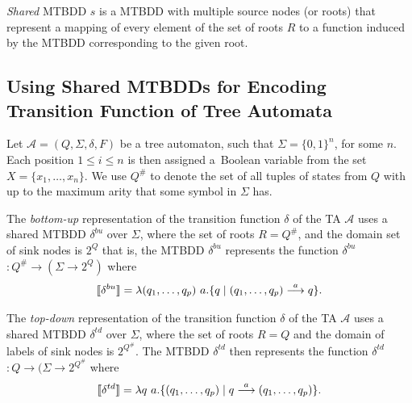 \emph{Shared} MTBDD $s$ is a MTBDD with multiple source nodes (or roots) that
represent a mapping of every element of the set of roots $R$ to a function
induced by the MTBDD corresponding to the given root.

\subsection[Usage of MTBDDs with TA]{Using Shared MTBDDs for Encoding
Transition Function of Tree Automata} Let $\mathcal{A} = (Q, \Sigma, \delta, F)$
be a tree automaton, such that $\Sigma = \{0, 1\}^n$, for some $n$. Each
position $1 \leq i \leq n$ is then assigned a~Boolean variable from the set $X =
\{x_1,\ldots,x_n\}$. We use $Q^\#$ to denote the set of all tuples of states from $Q$ with up to the
maximum arity that some symbol in $\Sigma$ has.

The \emph{bottom-up} representation of the transition function $\delta$ of the
TA $\mathcal{A}$ uses a shared MTBDD $\delta^{bu}$ over $\Sigma$, where the set
of roots $R = Q^\#$, and the domain set of sink nodes is $2^Q$ that is, the
MTBDD $\delta^{bu}$ represents the function \textlbrackdbl $\delta^{bu}$
\textrbrackdbl $: Q^\# \rightarrow (\Sigma \rightarrow 2^Q)$ where
 \begin{equation}
  \text{\textlbrackdbl} \delta^{bu} \text{\textrbrackdbl} =
 \lambda (q_1,\ldots,q_p)\ a . \{q \mid (q_1,\ldots,q_p)
 \overset{a}{\longrightarrow} q\}. \end{equation}

The \emph{top-down} representation of the transition function $\delta$ of the TA
$\mathcal{A}$ uses a shared MTBDD $\delta^{td}$ over $\Sigma$, where the set of
roots $R = Q$ and the domain of labels of sink nodes is $2^{Q^\#}$. The MTBDD
$\delta^{td}$ then represents the function \textlbrackdbl $\delta^{td}$
\textrbrackdbl $: Q \rightarrow (\Sigma \rightarrow 2^{Q^\#}$ where
\begin{equation} \text{\textlbrackdbl} \delta^{td} \text{\textrbrackdbl} =
\lambda q\ a .
\{(q_1,\ldots,q_p) \mid q \overset{a}{\longrightarrow} (q_1,\ldots,q_p)\}.
\end{equation}

